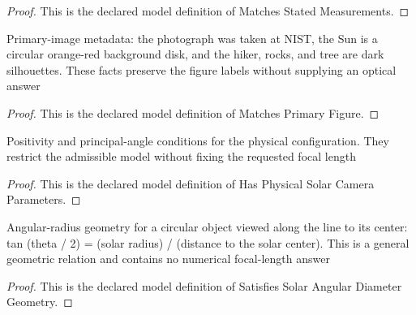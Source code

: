 \begin{proof}
  This is the declared model definition of Matches Stated Measurements.
\end{proof}
\begin{definition}
  \label{def:physics:phyx-mini-0153:phyxminiproblems-problemphyxmini0153-matchesprimaryfigure}
  Primary-image metadata: the photograph was taken at NIST, the Sun is a circular orange-red background disk, and the hiker, rocks, and tree are dark silhouettes. These facts preserve the figure labels without supplying an optical answer
\end{definition}
\begin{proof}
  This is the declared model definition of Matches Primary Figure.
\end{proof}
\begin{definition}
  \label{def:physics:phyx-mini-0153:phyxminiproblems-problemphyxmini0153-hasphysicalsolarcameraparameters}
  Positivity and principal-angle conditions for the physical configuration. They restrict the admissible model without fixing the requested focal length
\end{definition}
\begin{proof}
  This is the declared model definition of Has Physical Solar Camera Parameters.
\end{proof}
\begin{definition}
  \label{def:physics:phyx-mini-0153:phyxminiproblems-problemphyxmini0153-satisfiessolarangulardiametergeometry}
  Angular-radius geometry for a circular object viewed along the line to its center: tan (theta / 2) = (solar radius) / (distance to the solar center). This is a general geometric relation and contains no numerical focal-length answer
\end{definition}
\begin{proof}
  This is the declared model definition of Satisfies Solar Angular Diameter Geometry.
\end{proof}
